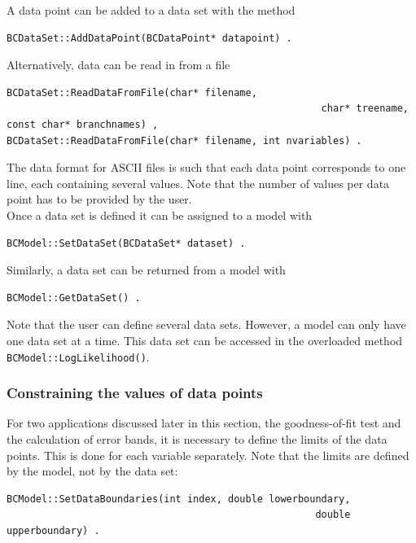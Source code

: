 \documentclass[11pt, a4paper]{article}
\begin{document}
\noindent
A data point can be added to a data set with the method

\begin{verbatim}
BCDataSet::AddDataPoint(BCDataPoint* datapoint) .
\end{verbatim}

\noindent
Alternatively, data can be read in from a file
%
\begin{verbatim}
BCDataSet::ReadDataFromFile(char* filename,
													  char* treename, const char* branchnames) ,
BCDataSet::ReadDataFromFile(char* filename, int nvariables) .
\end{verbatim}

\noindent
The data format for ASCII files is such that each data point
corresponds to one line, each containing several values. Note that the
number of values per data point has to be provided by the user. \\

\noindent
Once a data set is defined it can be assigned to a model with
%
\begin{verbatim}
BCModel::SetDataSet(BCDataSet* dataset) .
\end{verbatim}

\noindent
Similarly, a data set can be returned from a model with
%
\begin{verbatim}
BCModel::GetDataSet() .
\end{verbatim}

\noindent
Note that the user can define several data sets. However, a model can
only have one data set at a time. This data set can be accessed in the
overloaded method \verb|BCModel::LogLikelihood()|.


\subsubsection{Constraining the values of data points}

For two applications discussed later in this section, the
goodness-of-fit test and the calculation of error bands, it is
necessary to define the limits of the data points. This is done for
each variable separately. Note that the limits are defined by the
model, not by the data set:
%
\begin{verbatim}
BCModel::SetDataBoundaries(int index, double lowerboundary,
													 double upperboundary) .
\end{verbatim}
\end{document}
